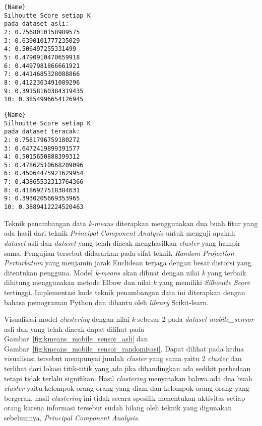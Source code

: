 \noindent\begin{minipage}{.46\textwidth}
\begin{lstlisting}[caption=\textit{Dataset mobile\_sensor} Asli,frame=tlrb, label=mobile_sensor_siluet_asli]{Name}
Silhoutte Score setiap K
pada dataset asli: 
2: 0.7568010158989575
3: 0.6390101777235029
4: 0.506497255331499
5: 0.4790910470659918
6: 0.4497981866661921
7: 0.4414685328088866
8: 0.4122363491089296
9: 0.39158160384319435
10: 0.3854996654126945
\end{lstlisting}
\end{minipage}\hfill
\begin{minipage}{.46\textwidth}
\begin{lstlisting}[caption=\textit{Dataset mobile\_sensor} Teracak,frame=tlrb, label=mobile_sensor_siluet_randomisasi]{Name}
Silhoutte Score setiap K
pada dataset teracak: 
2: 0.7581796759180272
3: 0.6472419899391577
4: 0.5015650888399312
5: 0.47862510668209096
6: 0.45064475921629954
7: 0.43865532313764366
8: 0.4186927518384631
9: 0.3930205669353965
10: 0.3889412224520463
\end{lstlisting}
\end{minipage}

Teknik penambangan data \textit{k-means} diterapkan menggunakan dua buah fitur yang ada hasil dari teknik \textit{Principal Component Analysis} untuk menguji apakah \textit{dataset} asli dan \textit{dataset} yang telah diacak menghasilkan \textit{cluster} yang hampir sama. Pengujian tersebut didasarkan pada sifat teknik \textit{Random Projection Perturbation} yang menjamin jarak Euclidean terjaga dengan besar distorsi yang ditentukan pengguna. Model \textit{k-means} akan dibuat dengan nilai \textit{k} yang terbaik dihitung menggunakan metode Elbow dan nilai \textit{k} yang memiliki \textit{Silhoutte Score} tertinggi. Implementasi kode teknik penambangan data ini diterapkan dengan bahasa pemograman Python dan dibantu oleh \textit{library} Scikit-learn. 

Visualisasi model \textit{clustering} dengan nilai \textit{k} sebesar 2 pada \textit{dataset} \textit{mobile\_sensor} asli dan yang telah diacak dapat dilihat pada Gambar~\ref{fig:kmeans_mobile_sensor_asli} dan Gambar~\ref{fig:kmeans_mobile_sensor_randomisasi}. Dapat dilihat pada kedua visualisasi tersebut mempunyai jumlah \textit{cluster} yang sama yaitu 2 \textit{cluster} dan terlihat dari lokasi titik-titik yang ada jika dibandingkan ada sedikit perbedaan tetapi tidak terlalu signifikan. Hasil \textit{clustering} menyatakan bahwa ada dua buah \textit{cluster} yaitu kelompok orang-orang yang diam dan kelompok orang-orang yang bergerak, hasil \textit{clustering} ini tidak secara spesifik menentukan aktivitas setiap orang karena informasi tersebut sudah hilang oleh teknik yang digunakan sebelumnya, \textit{Principal Component Analysis}. 
	
